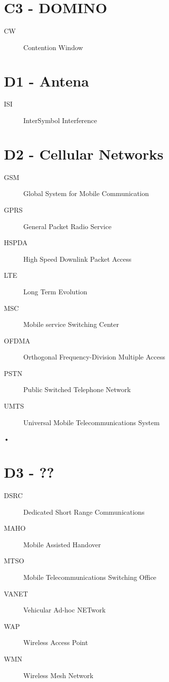 \documentclass[twocolumn]{article}
\begin{document}
\section*{C3 - DOMINO}
\begin{description}
\item[CW]Contention Window
\end{description}

\section*{D1 - Antena}
\begin{description}
\item[ISI]InterSymbol Interference
\end{description}

\section*{D2 - Cellular Networks}
\begin{description}
\item[GSM]Global System for Mobile Communication
\item[GPRS]General Packet Radio Service
\item[HSPDA]High Speed Downlink Packet Access
\item[LTE]Long Term Evolution
\item[MSC]Mobile service Switching Center
\item[OFDMA]Orthogonal Frequency-Division Multiple Access
\item[PSTN]Public Switched Telephone Network
\item[UMTS]Universal Mobile Telecommunications System
\end{description}•

\section{D3 - ??}
\begin{description}
\item[DSRC]Dedicated Short Range Communications
\item[MAHO]Mobile Assisted Handover
\item[MTSO]Mobile Telecommunications Switching Office
\item[VANET]Vehicular Ad-hoc NETwork
\item[WAP]Wireless Access Point
\item[WMN]Wireless Mesh Network


\end{description}
\end{document}
